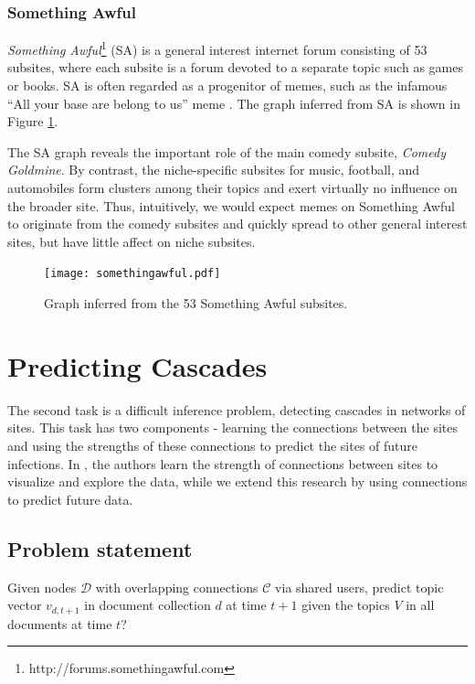 \documentclass{article} %
\begin{document}
\subsubsection{Something Awful}
\textit{Something Awful}\footnote{http://forums.somethingawful.com} (SA) is a general interest internet forum consisting of 53 subsites, where each subsite is a forum devoted to a separate topic such as games or books. SA is often regarded as a progenitor of memes, such as the infamous ``All your base are belong to us'' meme \cite{allyourbase}. The graph inferred from SA is shown in Figure \ref{fig:somethingawful}.

The SA graph reveals the important role of the main comedy subsite, \textit{Comedy Goldmine}. By contrast, the niche-specific subsites for music, football, and automobiles form clusters among their topics and exert virtually no influence on the broader site. Thus, intuitively, we would expect memes on Something Awful to originate from the comedy subsites and quickly spread to other general interest sites, but have little affect on niche subsites.

\begin{figure}[htb]
\centering
\texttt{[image: somethingawful.pdf]}
\caption{Graph inferred from the 53 Something Awful subsites.}
\label{fig:somethingawful}
\end{figure}

\section{Predicting Cascades}
\label{sec:prediction}

The second task is a difficult inference problem, detecting cascades in networks of sites. This task has two components - learning the connections between the sites and using the strengths of these connections to predict the sites of future infections. In \cite{netinf}, the authors learn the strength of connections between sites to visualize and explore the data, while we extend this research by using connections to predict future data.


\subsection{Problem statement}
Given nodes $\mathcal{D}$ with overlapping connections $\mathcal{C}$ via shared users, predict topic vector $v_{d,t+1}$ in document collection $d$ at time $t+1$ given the topics $V$ in all documents at time $t$?
\end{document}

